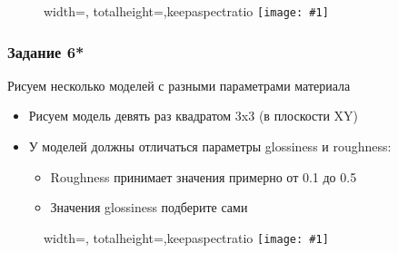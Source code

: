 \documentclass[10pt]{beamer}
\newcommand{\slideimage}[1]{
  \begin{figure}
    \begin{adjustbox}{width=\textwidth, totalheight=\textheight-2\baselineskip-2\baselineskip,keepaspectratio}
      \texttt{[image: \#1]}
    \end{adjustbox}
  \end{figure}
}
\begin{document}
\begin{frame}[fragile]
\slideimage{5.png}
\end{frame}

\begin{frame}[fragile]
\frametitle{Задание 6*}
Рисуем несколько моделей с разными параметрами материала
\begin{itemize}
\item Рисуем модель девять раз квадратом 3x3 (в плоскости XY)
\item У моделей должны отличаться параметры glossiness и roughness:
\begin{itemize}
\item Roughness принимает значения примерно от 0.1 до 0.5
\item Значения glossiness подберите сами
\end{itemize}
\end{itemize}
\end{frame}

\begin{frame}[fragile]
\slideimage{6.png}
\end{frame}
\end{document}
